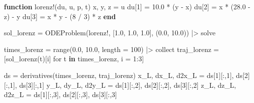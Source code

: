 \documentclass[
]{article}
\newenvironment{Shaded}{\begin{snugshade}}{\end{snugshade}}
\newcommand{\FloatTok}[1]{\textcolor[rgb]{0.68,0.00,0.00}{#1}}
\newcommand{\FunctionTok}[1]{\textcolor[rgb]{0.28,0.35,0.67}{#1}}
\newcommand{\KeywordTok}[1]{\textcolor[rgb]{0.00,0.23,0.31}{\textbf{#1}}}
\newcommand{\NormalTok}[1]{\textcolor[rgb]{0.00,0.23,0.31}{#1}}
\newcommand{\OperatorTok}[1]{\textcolor[rgb]{0.37,0.37,0.37}{#1}}
\begin{document}
\begin{Shaded}
\begin{Highlighting}[]
\KeywordTok{function} \FunctionTok{lorenz!}\NormalTok{(du, u, p, t)}
\NormalTok{    x, y, z }\OperatorTok{=}\NormalTok{ u}
\NormalTok{    du[}\FloatTok{1}\NormalTok{] }\OperatorTok{=} \FloatTok{10.0} \OperatorTok{*}\NormalTok{ (y }\OperatorTok{{-}}\NormalTok{ x)}
\NormalTok{    du[}\FloatTok{2}\NormalTok{] }\OperatorTok{=}\NormalTok{ x }\OperatorTok{*}\NormalTok{ (}\FloatTok{28.0} \OperatorTok{{-}}\NormalTok{ z) }\OperatorTok{{-}}\NormalTok{ y}
\NormalTok{    du[}\FloatTok{3}\NormalTok{] }\OperatorTok{=}\NormalTok{ x }\OperatorTok{*}\NormalTok{ y }\OperatorTok{{-}}\NormalTok{ (}\FloatTok{8} \OperatorTok{/} \FloatTok{3}\NormalTok{) }\OperatorTok{*}\NormalTok{ z}
\KeywordTok{end}

\NormalTok{sol\_lorenz }\OperatorTok{=} \FunctionTok{ODEProblem}\NormalTok{(lorenz!, [}\FloatTok{1.0}\NormalTok{, }\FloatTok{1.0}\NormalTok{, }\FloatTok{1.0}\NormalTok{], (}\FloatTok{0.0}\NormalTok{, }\FloatTok{10.0}\NormalTok{)) }\OperatorTok{|\textgreater{}}\NormalTok{ solve}

\NormalTok{times\_lorenz }\OperatorTok{=} \FunctionTok{range}\NormalTok{(}\FloatTok{0.0}\NormalTok{, }\FloatTok{10.0}\NormalTok{, length }\OperatorTok{=} \FloatTok{100}\NormalTok{) }\OperatorTok{|\textgreater{}}\NormalTok{ collect}
\NormalTok{traj\_lorenz }\OperatorTok{=}\NormalTok{ [}\FunctionTok{sol\_lorenz}\NormalTok{(t)[i] for t }\KeywordTok{in}\NormalTok{ times\_lorenz, i }\OperatorTok{=} \FloatTok{1}\OperatorTok{:}\FloatTok{3}\NormalTok{]}

\NormalTok{ds }\OperatorTok{=} \FunctionTok{derivatives}\NormalTok{(times\_lorenz, traj\_lorenz)}
\NormalTok{x\_L, dx\_L, d2x\_L }\OperatorTok{=}\NormalTok{ ds[}\FloatTok{1}\NormalTok{][}\OperatorTok{:}\NormalTok{,}\FloatTok{1}\NormalTok{], ds[}\FloatTok{2}\NormalTok{][}\OperatorTok{:}\NormalTok{,}\FloatTok{1}\NormalTok{], ds[}\FloatTok{3}\NormalTok{][}\OperatorTok{:}\NormalTok{,}\FloatTok{1}\NormalTok{]}
\NormalTok{y\_L, dy\_L, d2y\_L }\OperatorTok{=}\NormalTok{ ds[}\FloatTok{1}\NormalTok{][}\OperatorTok{:}\NormalTok{,}\FloatTok{2}\NormalTok{], ds[}\FloatTok{2}\NormalTok{][}\OperatorTok{:}\NormalTok{,}\FloatTok{2}\NormalTok{], ds[}\FloatTok{3}\NormalTok{][}\OperatorTok{:}\NormalTok{,}\FloatTok{2}\NormalTok{]}
\NormalTok{z\_L, dz\_L, d2z\_L }\OperatorTok{=}\NormalTok{ ds[}\FloatTok{1}\NormalTok{][}\OperatorTok{:}\NormalTok{,}\FloatTok{3}\NormalTok{], ds[}\FloatTok{2}\NormalTok{][}\OperatorTok{:}\NormalTok{,}\FloatTok{3}\NormalTok{], ds[}\FloatTok{3}\NormalTok{][}\OperatorTok{:}\NormalTok{,}\FloatTok{3}\NormalTok{]}


\end{Highlighting}
\end{Shaded}
\end{document}

